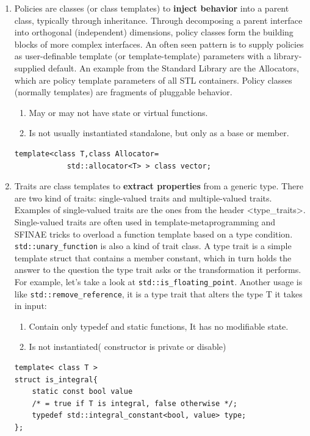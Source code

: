 \documentclass[a4paper,11pt,twoside]{book}
\begin{document}
\begin{itemize}
\begin{enumerate}
    \item Policies are classes (or class templates) to \textbf{inject behavior} into a parent class, typically through inheritance. Through decomposing a parent interface into orthogonal (independent) dimensions, policy classes form the building blocks of more complex interfaces. An often seen pattern is to supply policies as user-definable template (or template-template) parameters with a library-supplied default. An example from the Standard Library are the Allocators, which are policy template parameters of all STL containers. Policy classes (normally templates) are fragments of pluggable behavior.
        \begin{enumerate}
            \item May or may not have state or virtual functions.
            \item Is not usually instantiated standalone, but only as a base or member. 
        \end{enumerate}

\begin{lstlisting}[numbers=none]
template<class T,class Allocator=
			std::allocator<T> > class vector;
\end{lstlisting}
	
	\item Traits are class templates to \textbf{extract properties} from a generic type. There are two kind of traits: single-valued traits and multiple-valued traits. Examples of single-valued traits are the ones from the header <type\_traits>. Single-valued traits are often used in template-metaprogramming and SFINAE tricks to overload a function template based on a type condition. \texttt{std::unary\_function} is also a kind of trait class.  A type trait is a simple template struct that contains a member constant, which in turn holds the answer to the question the type trait asks or the transformation it performs. For example, let's take a look at \texttt{std::is\_floating\_point}. Another usage is like \texttt{std::remove\_reference}, it is a type trait that alters the type T it takes in input:

		\begin{enumerate}
			\item Contain only typedef and static functions, It has no modifiable state.
			\item Is not instantiated( constructor is private or disable)
		\end{enumerate}
	\begin{lstlisting}[numbers=none]
template< class T >
struct is_integral{
	static const bool value
	/* = true if T is integral, false otherwise */;
	typedef std::integral_constant<bool, value> type;
};
	

\end{lstlisting}
\end{enumerate}
\end{itemize}
\end{document}
